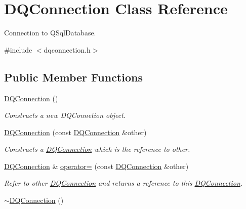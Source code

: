 \hypertarget{classDQConnection}{
\section{DQConnection Class Reference}
\label{classDQConnection}
}


Connection to QSqlDatabase.  




{\ttfamily \#include $<$dqconnection.h$>$}

\subsection*{Public Member Functions}
\begin{DoxyCompactItemize}
\item 
\hypertarget{classDQConnection_a00bf59c9ec282de950ec56165c21bb05}{
\hyperlink{classDQConnection_a00bf59c9ec282de950ec56165c21bb05}{DQConnection} ()}
\label{classDQConnection_a00bf59c9ec282de950ec56165c21bb05}

\begin{DoxyCompactList}\small\item\em Constructs a new DQConnetion object. \item\end{DoxyCompactList}\item 
\hypertarget{classDQConnection_a421ee145e39ab42e720b6717baab0599}{
\hyperlink{classDQConnection_a421ee145e39ab42e720b6717baab0599}{DQConnection} (const \hyperlink{classDQConnection}{DQConnection} \&other)}
\label{classDQConnection_a421ee145e39ab42e720b6717baab0599}

\begin{DoxyCompactList}\small\item\em Constructs a \hyperlink{classDQConnection}{DQConnection} which is the reference to other. \item\end{DoxyCompactList}\item 
\hypertarget{classDQConnection_a3ced9cdd2515210bad1ff79303ddbb4a}{
\hyperlink{classDQConnection}{DQConnection} \& \hyperlink{classDQConnection_a3ced9cdd2515210bad1ff79303ddbb4a}{operator=} (const \hyperlink{classDQConnection}{DQConnection} \&other)}
\label{classDQConnection_a3ced9cdd2515210bad1ff79303ddbb4a}

\begin{DoxyCompactList}\small\item\em Refer to other \hyperlink{classDQConnection}{DQConnection} and returns a reference to this \hyperlink{classDQConnection}{DQConnection}. \item\end{DoxyCompactList}\item 
\hypertarget{classDQConnection_ad961748eeb7d068b8d491afedb7f7751}{
\hyperlink{classDQConnection_ad961748eeb7d068b8d491afedb7f7751}{$\sim$DQConnection} ()}
\label{classDQConnection_ad961748eeb7d068b8d491afedb7f7751}


\end{DoxyCompactItemize}
